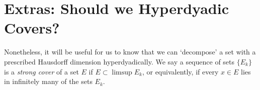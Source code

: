 %
%
%
%


\section{Extras: Should we Hyperdyadic Covers?}

Nonetheless, it will be useful for us to know that we can `decompose' a set with a prescribed Hausdorff dimension hyperdyadically. We say a sequence of sets $\{ E_k \}$ is a \emph{strong cover} of a set $E$ if $E \subset \limsup E_k$, or equivalently, if every $x \in E$ lies in infinitely many of the sets $E_k$.

